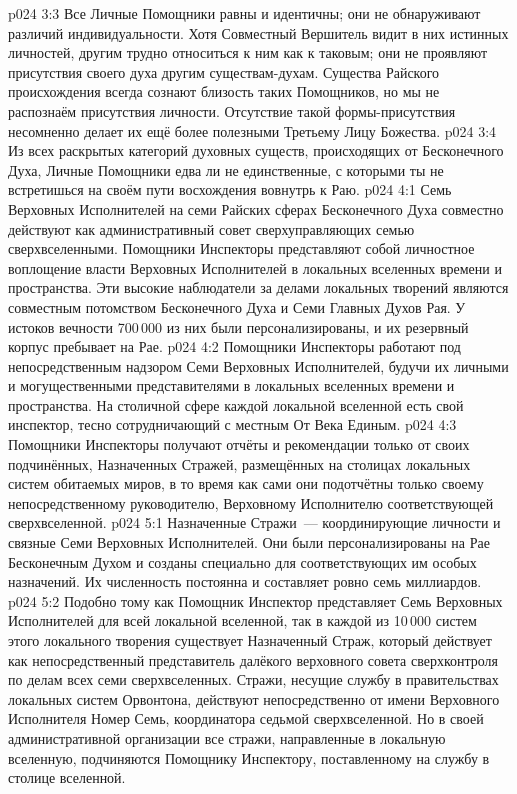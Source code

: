\vs p024 3:3 Все Личные Помощники равны и идентичны; они не обнаруживают различий индивидуальности. Хотя Совместный Вершитель видит в них истинных личностей, другим трудно относиться к ним как к таковым; они не проявляют присутствия своего духа другим существам\hyp{}духам. Существа Райского происхождения всегда сознают близость таких Помощников, но мы не распознаём присутствия личности. Отсутствие такой формы\hyp{}присутствия несомненно делает их ещё более полезными Третьему Лицу Божества.
\vs p024 3:4 Из всех раскрытых категорий духовных существ, происходящих от Бесконечного Духа, Личные Помощники едва ли не единственные, с которыми ты не встретишься на своём пути восхождения вовнутрь к Раю.
\vs p024 4:1 Семь Верховных Исполнителей на семи Райских сферах Бесконечного Духа совместно действуют как административный совет сверхуправляющих семью сверхвселенными. Помощники Инспекторы представляют собой личностное воплощение власти Верховных Исполнителей в локальных вселенных времени и пространства. Эти высокие наблюдатели за делами локальных творений являются совместным потомством Бесконечного Духа и Семи Главных Духов Рая. У истоков вечности 700\,000 из них были персонализированы, и их резервный корпус пребывает на Рае.
\vs p024 4:2 Помощники Инспекторы работают под непосредственным надзором Семи Верховных Исполнителей, будучи их личными и могущественными представителями в локальных вселенных времени и пространства. На столичной сфере каждой локальной вселенной есть свой инспектор, тесно сотрудничающий с местным От Века Единым.
\vs p024 4:3 Помощники Инспекторы получают отчёты и рекомендации только от своих подчинённых, Назначенных Стражей, размещённых на столицах локальных систем обитаемых миров, в то время как сами они подотчётны только своему непосредственному руководителю, Верховному Исполнителю соответствующей сверхвселенной.
\vs p024 5:1 Назначенные Стражи~--- координирующие личности и связные Семи Верховных Исполнителей. Они были персонализированы на Рае Бесконечным Духом и созданы специально для соответствующих им особых назначений. Их численность постоянна и составляет ровно семь миллиардов.
\vs p024 5:2 Подобно тому как Помощник Инспектор представляет Семь Верховных Исполнителей для всей локальной вселенной, так в каждой из 10\,000 систем этого локального творения существует Назначенный Страж, который действует как непосредственный представитель далёкого верховного совета сверхконтроля по делам всех семи сверхвселенных. Стражи, несущие службу в правительствах локальных систем Орвонтона, действуют непосредственно от имени Верховного Исполнителя Номер Семь, координатора седьмой сверхвселенной. Но в своей административной организации все стражи, направленные в локальную вселенную, подчиняются Помощнику Инспектору, поставленному на службу в столице вселенной.
